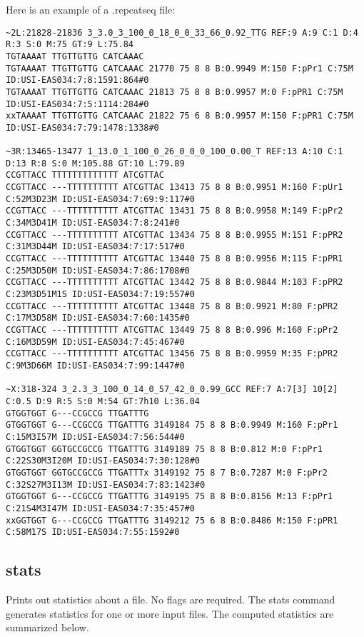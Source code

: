 \documentclass[11pt]{article}
\begin{document}
Here is an example of a .repeatseq file:
\begin{verbatim}
~2L:21828-21836 3_3.0_3_100_0_18_0_0_33_66_0.92_TTG REF:9 A:9 C:1 D:4 R:3 S:0 M:75 GT:9 L:75.84
TGTAAAAT TTGTTGTTG CATCAAAC
TGTAAAAT TTGTTGTTG CATCAAAC 21770 75 8 8 B:0.9949 M:150 F:pPr1 C:75M ID:USI-EAS034:7:8:1591:864#0
TGTAAAAT TTGTTGTTG CATCAAAC 21813 75 8 8 B:0.9957 M:0 F:pPR1 C:75M ID:USI-EAS034:7:5:1114:284#0
xxTAAAAT TTGTTGTTG CATCAAAC 21822 75 6 8 B:0.9957 M:150 F:pPR1 C:75M ID:USI-EAS034:7:79:1478:1338#0

~3R:13465-13477 1_13.0_1_100_0_26_0_0_0_100_0.00_T REF:13 A:10 C:1 D:13 R:8 S:0 M:105.88 GT:10 L:79.89
CCGTTACC TTTTTTTTTTTTT ATCGTTAC
CCGTTACC ---TTTTTTTTTT ATCGTTAC 13413 75 8 8 B:0.9951 M:160 F:pUr1 C:52M3D23M ID:USI-EAS034:7:69:9:117#0
CCGTTACC ---TTTTTTTTTT ATCGTTAC 13431 75 8 8 B:0.9958 M:149 F:pPr2 C:34M3D41M ID:USI-EAS034:7:8:241#0
CCGTTACC ---TTTTTTTTTT ATCGTTAC 13434 75 8 8 B:0.9955 M:151 F:pPR2 C:31M3D44M ID:USI-EAS034:7:17:517#0
CCGTTACC ---TTTTTTTTTT ATCGTTAC 13440 75 8 8 B:0.9956 M:115 F:pPR1 C:25M3D50M ID:USI-EAS034:7:86:1708#0
CCGTTACC ---TTTTTTTTTT ATCGTTAC 13442 75 8 8 B:0.9844 M:103 F:pPR2 C:23M3D51M1S ID:USI-EAS034:7:19:557#0
CCGTTACC ---TTTTTTTTTT ATCGTTAC 13448 75 8 8 B:0.9921 M:80 F:pPR2 C:17M3D58M ID:USI-EAS034:7:60:1435#0
CCGTTACC ---TTTTTTTTTT ATCGTTAC 13449 75 8 8 B:0.996 M:160 F:pPr2 C:16M3D59M ID:USI-EAS034:7:45:467#0
CCGTTACC ---TTTTTTTTTT ATCGTTAC 13456 75 8 8 B:0.9959 M:35 F:pPR2 C:9M3D66M ID:USI-EAS034:7:99:1447#0

~X:318-324 3_2.3_3_100_0_14_0_57_42_0_0.99_GCC REF:7 A:7[3] 10[2] C:0.5 D:9 R:5 S:0 M:54 GT:7h10 L:36.04
GTGGTGGT G---CCGCCG TTGATTTG
GTGGTGGT G---CCGCCG TTGATTTG 3149184 75 8 8 B:0.9949 M:160 F:pPr1 C:15M3I57M ID:USI-EAS034:7:56:544#0
GTGGTGGT GGTGCCGCCG TTGATTTG 3149189 75 8 8 B:0.812 M:0 F:pPr1 C:22S30M3I20M ID:USI-EAS034:7:30:128#0
GTGGTGGT GGTGCCGCCG TTGATTTx 3149192 75 8 7 B:0.7287 M:0 F:pPr2 C:32S27M3I13M ID:USI-EAS034:7:83:1423#0
GTGGTGGT G---CCGCCG TTGATTTG 3149195 75 8 8 B:0.8156 M:13 F:pPr1 C:21S4M3I47M ID:USI-EAS034:7:35:457#0
xxGGTGGT G---CCGCCG TTGATTTG 3149212 75 6 8 B:0.8486 M:150 F:pPR1 C:58M17S ID:USI-EAS034:7:55:1592#0
\end{verbatim}

\subsection{stats}
Prints out statistics about a file. No flags are required.
The stats command generates statistics for one or more input files. The computed statistics are summarized below.
\end{document}

